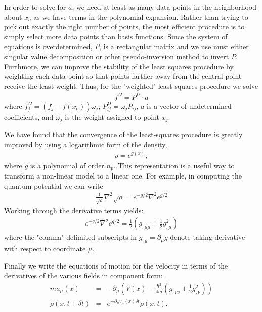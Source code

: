 In order to solve for $a$, we need at least as many data points in the 
neighborhood about $x_o$ as we have terms in the 
polynomial expansion.  Rather than trying to pick out exactly the 
right number of points, the most efficient procedure is to simply 
select more data points than basis functions.  Since the system of 
equations is overdetermined, $P$, is a rectangular matrix and 
we use must either singular value decomposition or other 
pseudo-inversion method to invert $P$.  Furthmore, we can 
improve the stability of the least squares procedure by weighting each 
data point so that points farther away from the central point receive 
the least weight.  Thus, for the "weighted" least squares procedure we 
solve
\begin{eqnarray}
f^{\Omega }  =   P^{\Omega }\cdot a
    \label{eq:wls}
\end{eqnarray}
where $f_j^\Omega=(f_j-f(x_o))\omega_j$, 
$P_{ij}^\Omega=\omega_jP_{i j}$, $a$
is a vector of undetermined coefficients, and $\omega_j$
is the weight assigned to point $x_j$.   

We have found that the convergence of the least-squares procedure is 
greatly improved by using a logarithmic form of the 
density\cite{ref14,ref16,numrec},
\begin{eqnarray}
\rho =e^{g(x)},
    \label{eq:exprho}
\end{eqnarray}
where $g$ is a polynomial of order $n_p$.  
This representation is a useful way to transform a non-linear model to a 
linear one.  For example, in computing the quantum potential we can write
\begin{eqnarray}
\frac{1}{\sqrt{\rho}}
\nabla^2\sqrt{\rho } = e^{-g/2}\nabla^2e^{g/2}
  \label{eq:qpot1}
\end{eqnarray}
Working through the derivative terms yields:
\begin{eqnarray}
e^{-g/2}\nabla^2e^{g/2} = \frac{1}{2}\left(g_{,\mu \mu }+\frac{1}{2}g_{,\mu}^{2}\right)   
    \label{eq:qpot2}
\end{eqnarray}
where the "comma" delimited subscripts in $g_{,u}=\partial_\mu g $ denote taking derivative
with respect to coordinate $\mu$.

Finally we write the equations of motion for the velocity in terms of 
the derivatives of the various fields in component form:
\begin{eqnarray}
    m a_{\mu }(x)   &=&   -\partial_\mu \left(V(x)- \frac{\hbar^2}{4  m}
    \left(g_{,\nu \nu} +\frac{1}{2}g_{,\nu }^{2}\right)\right) \\
\rho (x,t + \delta t)&=& e^{-\partial_\mu v_\mu(x)\delta t}\rho (x,t).
\end{eqnarray}

